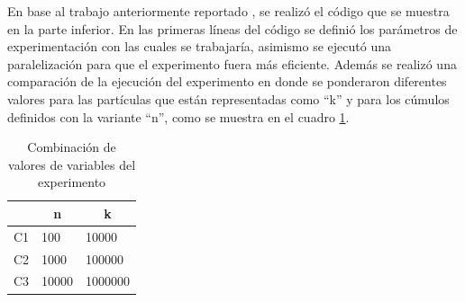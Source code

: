 \documentclass[12pt, letterpaper] {article}
\begin{document}
En base al trabajo anteriormente reportado \cite{Pr8Js}, se realizó el código que se muestra en la parte inferior. En las primeras líneas del c\'odigo se defini\'o los par\'ametros de experimentaci\'on con las cuales se trabajar\'ia, asimismo se ejecutó una paralelización para que el experimento fuera más eficiente. Además se realizó una comparación de la ejecución del experimento en donde se ponderaron diferentes valores para las partículas que están representadas como ``k'' y para los cúmulos definidos con la variante ``n'', como se muestra en el cuadro \ref{PondEx}.

\begin{table}[H]
\caption{Combinación de valores de variables del experimento}\label{PondEx}
\centering
\begin{tabular}{|l|l|l|}
\hline
\rowcolor[HTML]{EFEFEF} 
\multicolumn{1}{|c|}{\cellcolor[HTML]{EFEFEF}{\color[HTML]{333333} Nombre}} & \multicolumn{1}{c|}{\cellcolor[HTML]{EFEFEF} n } & \multicolumn{1}{c|}{\cellcolor[HTML]{EFEFEF} k} \\ \hline
\rowcolor[HTML]{ECF4FF} 
{\color[HTML]{333333} C1}                                        & {\color[HTML]{333333} 100}                                  & {\color[HTML]{333333} 10000}                             \\ \hline
\rowcolor[HTML]{ECF4FF} 
{\color[HTML]{333333} C2}                                        & {\color[HTML]{333333} 1000}                                 & {\color[HTML]{333333} 100000}                            \\ \hline
\rowcolor[HTML]{ECF4FF} 
{\color[HTML]{333333} C3}                                        & {\color[HTML]{333333} 10000}                                & {\color[HTML]{333333} 1000000}                           \\ \hline
\end{tabular}
\end{table}
\end{document}
